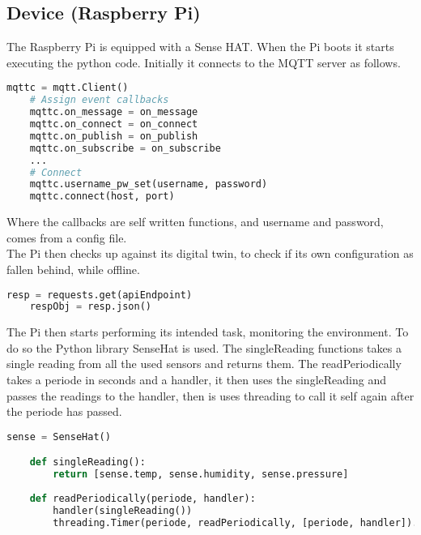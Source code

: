\subsection{Device (Raspberry Pi)}
The Raspberry Pi is equipped with a Sense HAT. When the Pi boots it starts executing the python code. Initially it connects to the MQTT server as follows.
\begin{lstlisting}[language=Python, caption=Python MQTT setup, label={lst:rpmqtt}]
    mqttc = mqtt.Client()
    # Assign event callbacks
    mqttc.on_message = on_message
    mqttc.on_connect = on_connect
    mqttc.on_publish = on_publish
    mqttc.on_subscribe = on_subscribe
    ...
    # Connect
    mqttc.username_pw_set(username, password)
    mqttc.connect(host, port) 
\end{lstlisting}
Where the callbacks are self written functions, and username and password, comes from a config file.\\
The Pi then checks up against its digital twin, to check if its own configuration as fallen behind, while offline.
\begin{lstlisting}[language=Python, caption=Python fetch digital twin config, label={lst:rpdtc}]
    resp = requests.get(apiEndpoint)
    respObj = resp.json()
\end{lstlisting}
The Pi then starts performing its intended task, monitoring the environment. To do so the Python library SenseHat is used. The singleReading functions takes a single reading from all the used sensors and returns them. The readPeriodically takes a periode in seconds and a handler, it then uses the singleReading and passes the readings to the handler, then is uses threading to call it self again after the periode has passed.
\begin{lstlisting}[language=Python, caption=Python reading from sensehat, label={lst:rprfsh}]
    sense = SenseHat()

    def singleReading():
        return [sense.temp, sense.humidity, sense.pressure]
    
    def readPeriodically(periode, handler): 
        handler(singleReading())
        threading.Timer(periode, readPeriodically, [periode, handler]).start()
\end{lstlisting}
